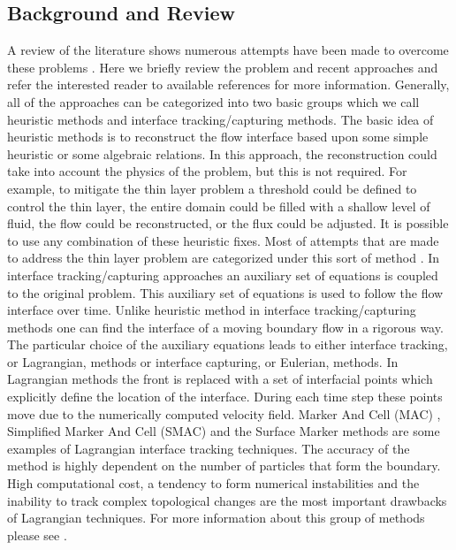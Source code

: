 \documentclass[letterpaper,10pt]{article}
\begin{document}
\subsection{Background and Review}
A review of the literature shows numerous attempts have been made to overcome these problems \cite{Medeiros2013,Balzano1998,Aureli2008,Bunya2009,Casulli2009,
Kesserwani2011,DAlpaos2007,Castro2005}.
Here we briefly review the problem and recent approaches and refer the interested reader to available references for more information.
Generally, all of the approaches can be 
categorized into two basic groups which we call heuristic methods and interface tracking/capturing methods.
The basic idea of heuristic methods is to reconstruct the flow interface based upon 
some simple heuristic or some algebraic relations. In this approach, the reconstruction could take into account the physics of the problem, but this is not required. 
For example, to mitigate the thin layer problem a threshold could be defined to control the thin layer, the entire domain could be filled with a shallow level of fluid,
the flow could be reconstructed, or the flux could be adjusted. It is possible to use any combination of these heuristic fixes.
Most of attempts that are made to address the thin layer problem are categorized under this sort of method \cite{Aureli2008,Bunya2009,Castro2005,Kesserwani2011}.
In interface tracking/capturing approaches
an auxiliary set of equations is coupled to the original problem. This auxiliary set of equations is used to follow the flow interface over time. 
Unlike heuristic method in interface tracking/capturing methods one can find the interface of a moving boundary flow in a rigorous way. 
The particular choice of the auxiliary equations leads to either interface tracking, or Lagrangian, methods or interface capturing, or Eulerian, methods.
In Lagrangian methods the front is replaced with a set of interfacial points which explicitly define the location of the interface.
During each time step these points move due to the numerically computed velocity field.
Marker And Cell (MAC) \cite{Harlow1965}, Simplified Marker And Cell (SMAC) \cite{Cheng1995} and the Surface Marker \citep{Wrobel1991} methods are some examples of Lagrangian interface tracking techniques.
The accuracy of the method is highly dependent on the number of particles that form the boundary.
High computational cost, a tendency to form numerical instabilities and the inability to track complex topological changes are the most important drawbacks of Lagrangian techniques.
For more information about this group of methods please see \cite{Glimm1995,Unverdi1992,Osher1988,Anderson1998,hirt1981vfv}.
\end{document}
